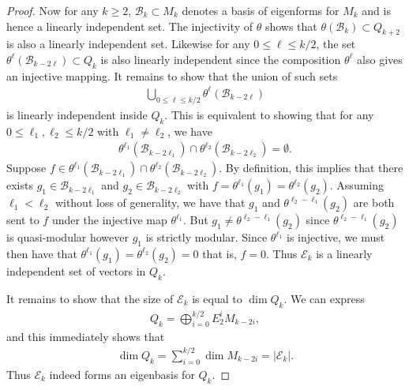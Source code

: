 \documentclass[12pt]{amsart}
\theoremstyle{plain}
\theoremstyle{definition}
\theoremstyle{remark}
\newcommand{\cB}{\mathcal{B}}
\newcommand{\cE}{\mathcal{E}}
\begin{document}
\begin{proof}
        Now for any $k \geq 2$, $\cB_{k} \subset M_{k}$ denotes a basis of eigenforms for $M_{k}$ and is hence a linearly independent set. The injectivity of $\theta$ shows that $\theta ( \cB_{k}) \subset Q_{k+2}$ is also a linearly independent set. Likewise for any $0 \leq \ell \leq k/2$, the set $\theta^{\ell} ( \cB_{k-2 \ell}) \subset Q_{k}$ is also linearly independent since the composition $\theta^{\ell}$ also gives an injective mapping. It remains to show that the union of such sets
        \begin{align*}
            \bigcup_{0 \leq \ell \leq k/2} \theta^{\ell} ( \cB_{k-2 \ell})
        \end{align*}
        is linearly independent inside $Q_{k}$. This is equivalent to showing that for any $0 \leq \ell_{1}, \ell_{2} \leq k/2$ with $\ell_{1} \neq \ell_{2}$, we have 
        \begin{align*}
            \theta^{\ell_{1}}(\cB_{k-2 \ell_{1}}) \cap \theta^{\ell_{2}}(\cB_{k-2 \ell_{2}}) = \emptyset.         
        \end{align*}
        Suppose $f \in \theta^{\ell_{1}}(\cB_{k-2 \ell_{1}}) \cap \theta^{\ell_{2}}(\cB_{k-2 \ell_{2}})$. By definition, this implies that there exists $g_{1} \in \cB_{k-2 \ell_{1}}$ and $g_{2} \in \cB_{k-2 \ell_{2}}$ with $f = \theta^{\ell_{1}}(g_{1}) = \theta^{\ell_{2}}(g_{2})$. Assuming $\ell_{1} < \ell_{2}$ without loss of generality, we have that $g_{1}$ and $\theta^{\ell_{2} - \ell_{1}}(g_{2})$ are both sent to $f$ under the injective map $\theta^{\ell_{1}}$. But $g_{1} \neq \theta^{\ell_{2} - \ell_{1}}(g_{2})$ since $\theta^{\ell_{2} - \ell_{1}}(g_{2})$ is quasi-modular however $g_{1}$ is strictly modular. Since $\theta^{\ell_{1}}$ is injective, we must then have that $\theta^{\ell_{1}}(g_{1}) = \theta^{\ell_{2}}(g_{2}) = 0$ that is, $f=0$. Thus $\cE_k$ is a linearly independent set of vectors in $Q_k$.
            
        It remains to show that the size of $\cE_k$ is equal to $\dim Q_k$. We can express
        \begin{align*}
            Q_{k} = \bigoplus_{i=0}^{k/2} E_{2}^{i}M_{k-2i},
        \end{align*}
        and this immediately shows that
        \begin{align*}
            \dim Q_{k} = \sum_{i=0}^{k/2} \dim M_{k-2i} = \vert \cE_{k} \vert.
        \end{align*}
        Thus $\cE_k$ indeed forms an eigenbasis for $Q_k$.
        \end{proof}
\end{document}
